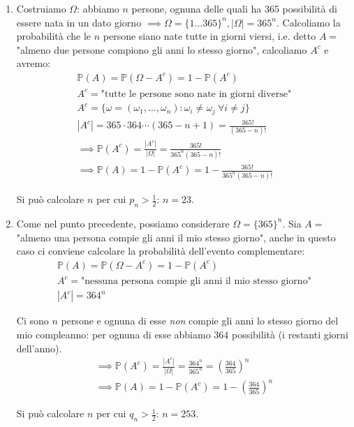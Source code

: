 \begin{enumerate}
\item Costruiamo $\Omega $: abbiamo $n$ persone, ognuna delle quali ha $365$ possibilità di essere nata in un dato giorno $\implies \Omega =\{1\dotsc 365\}^{n} ,| \Omega | =365^{n}$. Calcoliamo la probabilità che le $n$ persone siano nate tutte in giorni viersi, i.e. detto $A=$ "almeno due persone compiono gli anni lo stesso giorno", calcoliamo $A^{c}$ e avremo:\begin{equation*}
\begin{array}{ l }
\mathbb{P}( A) =\mathbb{P}\left( \Omega -A^{c}\right) =1-\mathbb{P}\left( A^{c}\right)\\
A^{c} =\text{"tutte le persone sono nate in giorni diverse"}\\
A^{c} =\{\omega =( \omega _{1} ,\dotsc ,\omega _{n}) :\omega _{i} \neq \omega _{j} \ \forall i\neq j\}\\
\left| A^{c}\right| =365\cdot 364\cdots ( 365-n+1) =\frac{365!}{( 365-n) !}\\
\mathbb{\implies P}\left( A^{c}\right) =\frac{\left| A^{c}\right| }{| \Omega | } =\frac{365!}{365^{n}( 365-n) !}\\
\mathbb{\implies P}( A) =1-\mathbb{P}\left( A^{c}\right) =1-\frac{365!}{365^{n}( 365-n) !}
\end{array}
\end{equation*}

Si può calcolare $n$ per cui $p_{n}  >\frac{1}{2}$: $n=23$.
\item Come nel punto precedente, possiamo considerare $\Omega =\{365\}^{n}$. Sia $A=$ "almeno una persona compie gli anni il mio stesso giorno", anche in questo caso ci conviene calcolare la probabilità dell'evento complementare:\begin{equation*}
\begin{array}{ l }
\mathbb{P}( A) =\mathbb{P}\left( \Omega -A^{c}\right) =1-\mathbb{P}\left( A^{c}\right)\\
A^{c} =\text{"nessuna persona compie gli anni il mio stesso giorno"}\\
\left| A^{c}\right| =364^{n}
\end{array}
\end{equation*}

Ci sono $n$ persone e ognuna di esse \textit{non} compie gli anni lo stesso giorno del mio compleanno: per ognuna di esse abbiamo $364$ possibilità (i restanti giorni dell'anno).\begin{equation*}
\begin{array}{ l }
\mathbb{\implies P}\left( A^{c}\right) =\frac{\left| A^{c}\right| }{| \Omega | } =\frac{364^{n}}{365^{n}} =\left(\frac{364}{365}\right)^{n}\\
\mathbb{\implies P}( A) =1-\mathbb{P}\left( A^{c}\right) =1-\left(\frac{364}{365}\right)^{n}
\end{array}
\end{equation*}

Si può calcolare $n$ per cui $q_{n}  >\frac{1}{2}$: $n=253$.
\end{enumerate}
\Soluzione

